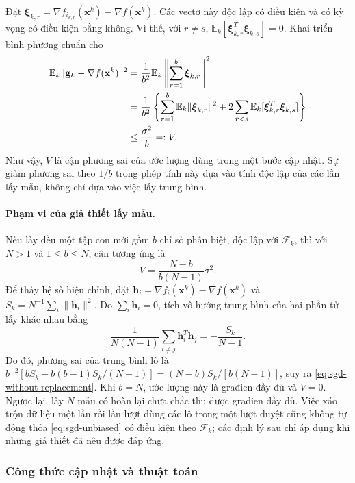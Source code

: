 Đặt $\boldsymbol{\xi}_{k,r}=\nabla f_{i_{k,r}}(\mathbf{x}^{k})-
\nabla f(\mathbf{x}^{k})$. Các vectơ này độc lập có điều kiện và có kỳ vọng
có điều kiện bằng không. Vì thế, với $r\ne s$,
$\mathbb{E}_k[\boldsymbol{\xi}_{k,r}^{T}\boldsymbol{\xi}_{k,s}]=0$.
Khai triển bình phương chuẩn cho
\begin{align}
 \mathbb{E}_k\|\mathbf{g}_k-\nabla f(\mathbf{x}^{k})\|^2
 &=\frac{1}{b^2}\mathbb{E}_k
                  \left\|\sum_{r=1}^{b}\boldsymbol{\xi}_{k,r}\right\|^2\notag\\
 &=\frac{1}{b^2}\left\{
   \sum_{r=1}^{b}\mathbb{E}_k\|\boldsymbol{\xi}_{k,r}\|^2
   +2\sum_{r<s}\mathbb{E}_k[
           \boldsymbol{\xi}_{k,r}^{T}\boldsymbol{\xi}_{k,s}]\right\}\notag\\
 &\leq\frac{\sigma^2}{b}=:V.
 \label{eq:sgd-variance}
\end{align}
Như vậy, $V$ là cận phương sai của ước lượng dùng trong một bước cập nhật.
Sự giảm phương sai theo $1/b$ trong phép tính này dựa vào tính độc lập
của các lần lấy mẫu, không chỉ dựa vào việc lấy trung bình.

\paragraph{Phạm vi của giả thiết lấy mẫu.}
Nếu lấy đều một tập con mới gồm $b$ chỉ số phân biệt, độc lập với
$\mathcal{F}_k$, thì với $N>1$ và $1\leq b\leq N$, cận tương ứng là
\begin{equation}
 V=\frac{N-b}{b(N-1)}\sigma^2.
 \label{eq:sgd-without-replacement}
\end{equation}
Để thấy hệ số hiệu chỉnh, đặt
$\mathbf{h}_i=\nabla f_i(\mathbf{x}^{k})-\nabla f(\mathbf{x}^{k})$ và
$S_k=N^{-1}\sum_i\|\mathbf{h}_i\|^2$. Do $\sum_i\mathbf{h}_i=0$, tích
vô hướng trung bình của hai phần tử lấy khác nhau bằng
\[
 \frac{1}{N(N-1)}\sum_{i\ne j}\mathbf{h}_i^T\mathbf{h}_j
 =-\frac{S_k}{N-1}.
\]
Do đó, phương sai của trung bình lô là
$b^{-2}[bS_k-b(b-1)S_k/(N-1)]
=(N-b)S_k/[b(N-1)]$, suy ra \eqref{eq:sgd-without-replacement}.
Khi $b=N$, ước lượng này là građien đầy đủ và $V=0$.
Ngược lại, lấy $N$ mẫu có hoàn lại chưa chắc thu được građien đầy đủ.
Việc xáo trộn dữ liệu một lần rồi lần lượt dùng các lô trong một lượt
duyệt cũng không tự động thỏa \eqref{eq:sgd-unbiased} có điều kiện theo
$\mathcal{F}_k$; các định lý sau chỉ áp dụng khi những giả thiết đã nêu
được đáp ứng.

\subsubsection{Công thức cập nhật và thuật toán}

